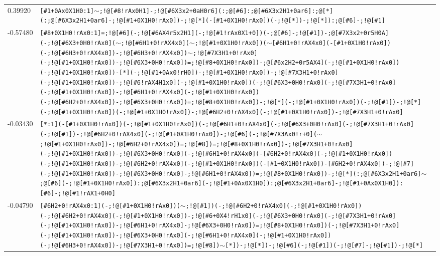 \begin{longtable}{>{\baselineskip=10pt}p{} >{\baselineskip=10pt}p{}}
0.39920 & \texttt{[\#1+0Ax0X1H0:1]$\sim$;!@[\#8!rAx0H1]-;!@[\#6X3x2+0aH0r6](:;@[\#6]:;@[\#6X3x2H1+0ar6]:;@[*](:;@[\#6X3x2H1+0ar6]-;!@[\#1+0X1H0!rAx0])-;!@[*](-[\#1+0X1H0!rAx0])(-;!@[*])-;!@[*]):;@[\#6]-;!@[\#1]} \\ 
-0.57480 & \texttt{[\#8+0X1H0!rAx0:1]=;!@[\#6](-;!@[\#6AX4r5x2H1](-;!@[\#1!rAx0X1+0])(-;@[\#6]-;!@[\#1])-;@[\#7X3x2+0r5H0A](-;!@[\#6X3+0H0!rAx0]($\sim$;!@[\#6H1+0!rAX4x0]($\sim$;!@[\#1+0X1H0!rAx0])($\sim$[\#6H1+0!rAX4x0](-[\#1+0X1H0!rAx0])(-;!@[\#6H3+0!rAX4x0])-;!@[\#6H3+0!rAX4x0])$\sim$;!@[\#7X3H1+0!rAx0](-;!@[\#1+0X1H0!rAx0])-;!@[\#6X3+0H0!rAx0])=;!@[\#8+0X1H0!rAx0])-;@[\#6x2H2+0r5AX4](-;!@[\#1+0X1H0!rAx0])(-;!@[\#1+0X1H0!rAx0])-[*](-;!@[\#1+0Ax0!rH0])-;!@[\#1+0X1H0!rAx0])-;!@[\#7X3H1+0!rAx0](-;!@[\#1+0X1H0!rAx0])-;!@[\#6!rAX4H1x0](-;!@[\#1+0X1H0!rAx0])(-;!@[\#6X3+0H0!rAx0](-;!@[\#7X3H1+0!rAx0](-;!@[\#1+0X1H0!rAx0])-;!@[\#6H1+0!rAX4x0](-;!@[\#1+0X1H0!rAx0])(-;!@[\#6H2+0!rAX4x0])-;!@[\#6X3+0H0!rAx0])=;!@[\#8+0X1H0!rAx0])-;!@[*](-;!@[\#1+0X1H0!rAx0])(-;!@[\#1])-;!@[*](-;!@[\#1+0X1H0!rAx0])(-;!@[\#1+0X1H0!rAx0])-;!@[\#6H2+0!rAX4x0](-;!@[\#1+0X1H0!rAx0])-;!@[\#7X3H1+0!rAx0]} \\ 
-0.03430 & \texttt{[*:1](-[\#1+0X1H0!rAx0])(-;!@[\#1+0X1H0!rAx0])(-;!@[\#6H1+0!rAX4x0](-;!@[\#6X3+0H0!rAx0](-;!@[\#7X3H1+0!rAx0](-;!@[\#1])-;!@[\#6H2+0!rAX4x0](-;!@[\#1+0X1H0!rAx0])-;!@[\#6](-;!@[\#7X3Ax0!r+0]($\sim$;!@[\#1+0X1H0!rAx0])-;!@[\#6H2+0!rAX4x0])=;!@[\#8])=;!@[\#8+0X1H0!rAx0])-;!@[\#7X3H1+0!rAx0](-;!@[\#1+0X1H0!rAx0])-;!@[\#6X3+0H0!rAx0](-;!@[\#6H1+0!rAX4x0](-[\#6H2+0!rAX4x0](-;!@[\#1+0X1H0!rAx0])(-;!@[\#1+0X1H0!rAx0])-;!@[\#6H2+0!rAX4x0](-;!@[\#1+0X1H0!rAx0])(-[\#1+0X1H0!rAx0])-[\#6H2+0!rAX4x0])-;!@[\#7](-;!@[\#1+0X1H0!rAx0])-;!@[\#6X3+0H0!rAx0]-;!@[\#6H1+0!rAX4x0])=;!@[\#8+0X1H0!rAx0])-;!@[*](:;@[\#6X3x2H1+0ar6]$\sim$;@[\#6](-;!@[\#1+0X1H0!rAx0]):;@[\#6X3x2H1+0ar6](-;!@[\#1+0Ax0X1H0]):;@[\#6X3x2H1+0ar6]-;!@[\#1+0Ax0X1H0]):[\#6]-;!@[\#1!rAX1+0H0]} \\ 
-0.04790 & \texttt{[\#6H2+0!rAX4x0:1](-;!@[\#1+0X1H0!rAx0])($\sim$;!@[\#1])(-;!@[\#6H2+0!rAX4x0](-;!@[\#1+0X1H0!rAx0])(-;!@[\#6H2+0!rAX4x0](-;!@[\#1+0X1H0!rAx0])-;!@[\#6+0X4!rH1x0](-;!@[\#6X3+0H0!rAx0](-;!@[\#7X3H1+0!rAx0](-;!@[\#1+0X1H0!rAx0])-;!@[\#6H1+0!rAX4x0]-;!@[\#6X3+0H0!rAx0])=;!@[\#8+0X1H0!rAx0])(-;!@[\#7X3H1+0!rAx0](-;!@[\#1+0X1H0!rAx0])-;!@[\#6X3+0H0!rAx0](-;!@[\#6H1+0!rAX4x0](-;!@[\#1+0X1H0!rAx0])(-;!@[\#6H3+0!rAX4x0])-;!@[\#7X3H1+0!rAx0])=;!@[\#8])$\sim$[*])-;!@[*])-;!@[\#6](-;!@[\#1])(-;!@[\#7]-;!@[\#1])-;!@[*]} \\ 

\end{longtable}
